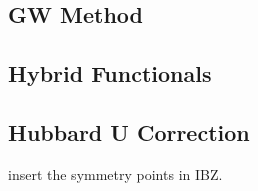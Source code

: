     \subsection{GW Method}
    \subsection{Hybrid Functionals}
    \subsection{Hubbard U Correction}

    {\color{red} insert the symmetry points in IBZ.}



